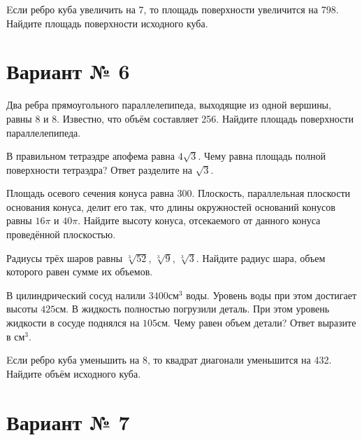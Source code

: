 \documentclass[4apaper]{article}
\begin{document}
\begin{taskBN}{6}
Eсли ребро куба увеличить на 7, то площадь поверхности увеличится на 798. Найдите площадь поверхности исходного куба.
\end{taskBN}
\newpage\section*{Вариант № 6}

\begin{taskBN}{1}
Два ребра прямоугольного параллелепипеда, выходящие из одной вершины, равны 8 и 8. Известно, что объём составляет 256. Найдите площадь поверхности параллелепипеда.
\end{taskBN}

\begin{taskBN}{2}
В правильном тетраэдре апофема равна $4\sqrt{3}$. Чему равна площадь полной поверхности тетраэдра? Ответ разделите на $\sqrt{3}$.
\end{taskBN}

\begin{taskBN}{3}
Площадь осевого сечения конуса равна $300$. Плоскость, параллельная плоскости основания конуса,  делит его так, что длины окружностей оснований конусов равны $16\pi$ и $40\pi$. Найдите высоту конуса, отсекаемого от данного конуса проведённой плоскостью. 
\end{taskBN}

\begin{taskBN}{4}
Радиусы трёх шаров равны $\sqrt[3]{52}$, $\sqrt[3]{9}$, $\sqrt[3]{3}$. Найдите радиус шара, объем которого равен сумме их объемов.
\end{taskBN}

\begin{taskBN}{5}
В цилиндрический сосуд налили $3400\mbox{см}^3$ воды. Уровень воды при этом достигает высоты $425$см. В жидкость полностью погрузили деталь. При этом уровень жидкости в сосуде поднялся на $105$см. Чему равен объем детали? Ответ выразите в $\mbox{см}^3$.
\end{taskBN}

\begin{taskBN}{6}
Eсли ребро куба уменьшить на 8, то квадрат диагонали уменьшится на 432. Найдите объём исходного куба.
\end{taskBN}
\newpage\section*{Вариант № 7}
\end{document}
